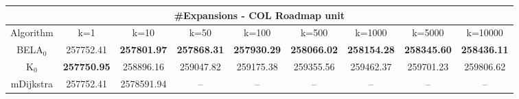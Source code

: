 \begin{tabular}{c|cccccccc}\toprule
\multicolumn{9}{c}{#Expansions - COL Roadmap unit}\\ \midrule
Algorithm & k=1 & k=10 & k=50 & k=100 & k=500 & k=1000 & k=5000 & k=10000 \\ \midrule
BELA$_0$ & 257752.41 & \textbf{257801.97} & \textbf{257868.31} & \textbf{257930.29} & \textbf{258066.02} & \textbf{258154.28} & \textbf{258345.60} & \textbf{258436.11} \\
K$_0$ & \textbf{257750.95} & 258896.16 & 259047.82 & 259175.38 & 259355.56 & 259462.37 & 259701.23 & 259806.62 \\
mDijkstra & 257752.41 & 2578591.94 & -- & -- & -- & -- & -- & -- \\ \bottomrule 
\end{tabular}
